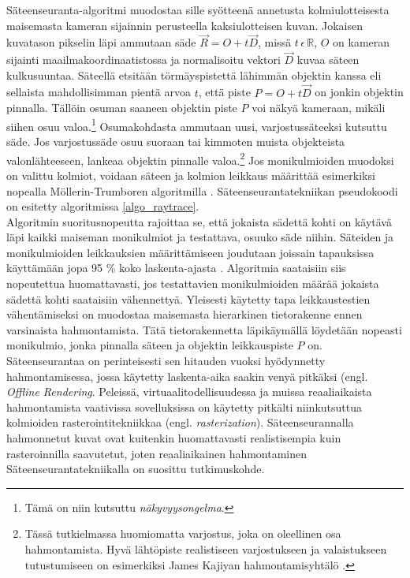 \documentclass[a4paper, 12pt, titlepage]{article}
\newcommand{\R}{\mathbb{R}}
\begin{document}
Säteenseuranta-algoritmi muodostaa sille syötteenä annetusta kolmiulotteisesta maisemasta kameran sijainnin perusteella kaksiulotteisen kuvan. Jokaisen kuvatason pikselin läpi ammutaan säde $\vec{R}=O+t\vec{D}$, missä $t\,\epsilon\,\R$, $O$ on kameran sijainti maailmakoordinaatistossa ja normalisoitu vektori $\vec{D}$ kuvaa säteen kulkusuuntaa. Säteellä etsitään törmäyspistettä lähimmän objektin kanssa eli sellaista mahdollisimman pientä arvoa $t$, että piste $P=O+t\vec{D}$ on jonkin objektin pinnalla. Tällöin osuman saaneen objektin piste $P$ voi näkyä kameraan, mikäli siihen osuu valoa.\footnote{Tämä on niin kutsuttu \emph{näkyvyysongelma}.} Osumakohdasta ammutaan uusi, varjostussäteeksi kutsuttu säde. Jos varjostussäde osuu suoraan tai kimmoten muista objekteista valonlähteeseen, lankeaa objektin pinnalle valoa.\footnote{Tässä tutkielmassa huomiomatta varjostus, joka on oleellinen osa hahmontamista. Hyvä lähtöpiste realistiseen varjostukseen ja valaistukseen tutustumiseen on esimerkiksi James Kajiyan hahmontamisyhtälö \citep[ks.][]{kajiya}.}  \citep[.]{janke} Jos monikulmioiden muodoksi on valittu kolmiot, voidaan säteen ja kolmion leikkaus määrittää esimerkiksi nopealla Möllerin-Trumboren algoritmilla \citep[ks.][]{moller}. Säteenseurantatekniikan pseudokoodi on esitetty algoritmissa \ref{algo_raytrace}.\\


Algoritmin suoritusnopeutta rajoittaa se, että jokaista sädettä kohti on käytävä läpi kaikki maiseman monikulmiot ja testattava, osuuko säde niihin. Säteiden ja monikulmioiden leikkauksien määrittämiseen joudutaan joissain tapauksissa käyttämään jopa 95 \% koko laskenta-ajasta \citep{whitted}. Algoritmia saataisiin siis nopeutettua huomattavasti, jos testattavien monikulmioiden määrää jokaista sädettä kohti saataisiin vähennettyä. Yleisesti käytetty tapa leikkaustestien vähentämiseksi on muodostaa maisemasta hierarkinen tietorakenne ennen varsinaista hahmontamista. Tätä tietorakennetta läpikäymällä löydetään nopeasti monikulmio, jonka pinnalla säteen ja objektin leikkauspiste $P$ on. \citep[.]{rubin}\\

Säteenseurantaa on perinteisesti sen hitauden vuoksi hyödynnetty hahmontamisessa, jossa käytetty laskenta-aika saakin venyä pitkäksi (engl. \emph{Offline Rendering}. Peleissä, virtuaalitodellisuudessa ja muissa reaaliaikaista hahmontamista vaativissa sovelluksissa on käytetty pitkälti niinkutsuttua kolmioiden rasterointitekniikkaa (engl. \emph{rasterization}). Säteenseurannalla hahmonnetut kuvat ovat kuitenkin huomattavasti realistisempia kuin rasteroinnilla saavutetut, joten reaaliaikainen hahmontaminen Säteenseurantatekniikalla on suosittu tutkimuskohde. \citep[.]{wald04}  
 
\end{document}
